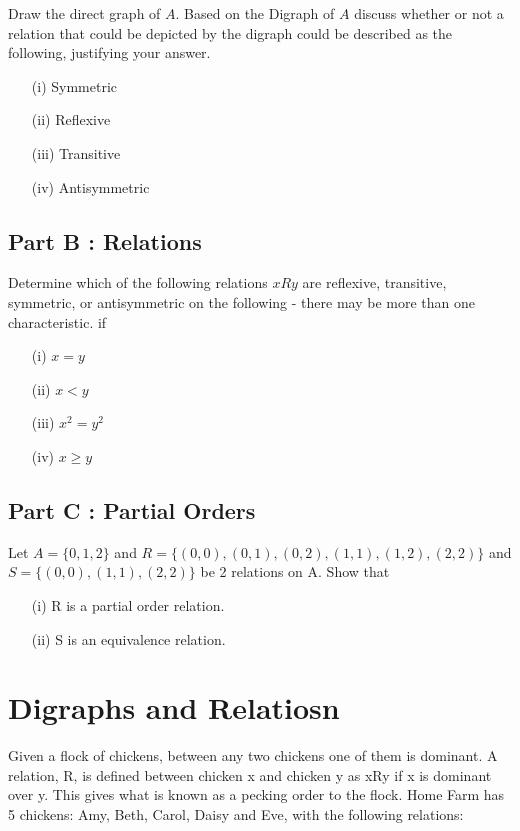 \documentclass[]{report}
\begin{document}
Draw the direct graph of $A$. Based on the Digraph of $A$ discuss whether or not a relation that could be depicted by the digraph could be described as the following, justifying your answer.


\begin{itemize}
\item[(i)] Symmetric
\item[(ii)] Reflexive 
\item[(iii)] Transitive
\item[(iv)] Antisymmetric
\end{itemize}
\subsection*{Part B : Relations}
Determine which of the following relations $ x R y$ are reflexive, transitive, symmetric, or antisymmetric on the following - there may be more than one characteristic.  if

\begin{itemize} 
\item[(i)] $x = y$
\item[(ii)] $x < y$
\item[(iii)] $x^2 = y^2$
\item[(iv)] $x \geq y$
\end{itemize}
\subsection*{Part C : Partial Orders}

Let $A=\{0,1,2\}$ and $R=\{ (0,0),(0,1),(0,2),(1,1), (1,2), (2,2)\}$
and $S=\{(0,0),(1,1),(2,2)\}$ be 2 relations on A. Show that

\begin{itemize}
\item[(i)] R is a partial order relation.
\item[(ii)] S is an equivalence relation.
\end{itemize}



\section{Digraphs and Relatiosn}
Given a flock of chickens, between any two chickens one of them is
dominant. A relation, R, is defined between chicken x and chicken y as xRy if x is
dominant over y. This gives what is known as a pecking order to the flock. Home
Farm has 5 chickens: Amy, Beth, Carol, Daisy and Eve, with the following relations:
\end{document}
